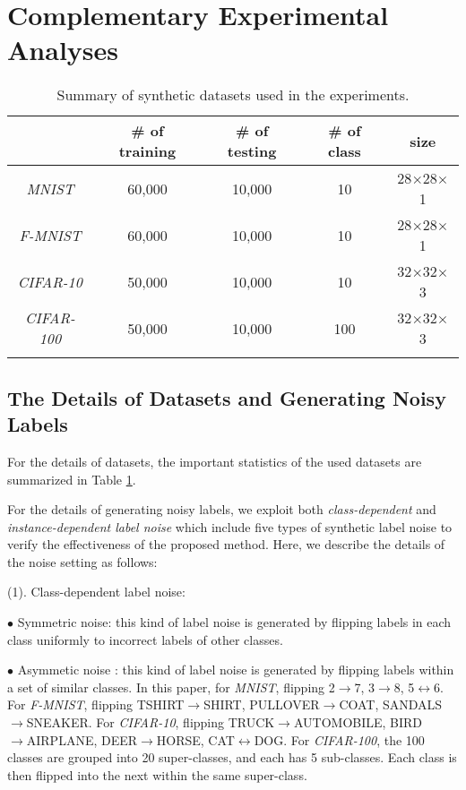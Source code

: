 \documentclass[11pt]{article}
\begin{document}
\section{Complementary Experimental Analyses}


\begin{table}[!htbp]
    \centering
    \begin{tabular}{c|c|c|c|c}
    \Xhline{2\arrayrulewidth}	 
         &\# of training&\# of testing&\# of class & size\\
         \hline
         \textit{MNIST} & 60,000 & 10,000 & 10 & 28$\times$28$\times$1\\
         \hline
         \textit{F-MNIST}  & 60,000 & 10,000 & 10 & 28$\times$28$\times$1\\
         \hline
         \textit{CIFAR-10} & 50,000 & 10,000 & 10 & 32$\times$32$\times$3\\
         \hline
         \textit{CIFAR-100}  & 50,000 & 10,000 & 100 & 32$\times$32$\times$3\\
    \Xhline{2\arrayrulewidth}	 
    \end{tabular}
    \caption{Summary of synthetic datasets used in the experiments.}
    \label{tab:syn_dataset}
\end{table}



\subsection{The Details of Datasets and Generating Noisy Labels}
For the details of datasets, the important statistics of the used datasets are summarized in Table \ref{tab:syn_dataset}.

For the details of generating noisy labels, we exploit both \textit{class-dependent} and \textit{instance-dependent label noise} which include five types of synthetic label noise to verify the effectiveness of the proposed method. Here, we describe the details of the noise setting as follows: 

(1). Class-dependent label noise: 

$\bullet$ Symmetric noise: this kind of label noise is generated by flipping labels in each class uniformly to incorrect labels of other classes.

$\bullet$ Asymmetic noise : this kind of label noise is generated by flipping labels within a set of similar classes. In this paper, for \textit{MNIST}, flipping 2$\rightarrow$7, 3$\rightarrow$8, 5$\leftrightarrow$6. For \textit{F-MNIST}, flipping TSHIRT$\rightarrow$SHIRT, PULLOVER$\rightarrow$COAT, SANDALS$\rightarrow$SNEAKER. For \textit{CIFAR-10}, flipping TRUCK$\rightarrow$AUTOMOBILE, BIRD\\$\rightarrow$AIRPLANE, DEER$\rightarrow$HORSE, CAT$\leftrightarrow$DOG. For \textit{CIFAR-100}, the 100 classes are grouped into 20 super-classes, and each has 5 sub-classes. Each class is then flipped into the next within the same super-class. 
\end{document}

